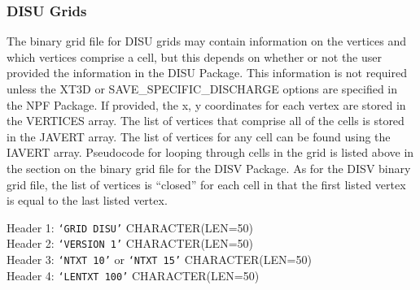 \newpage
\subsubsection{DISU Grids}

The binary grid file for DISU grids may contain information on the vertices and which vertices comprise a cell, but this depends on whether or not the user provided the information in the DISU Package.  This information is not required unless the XT3D or SAVE\_SPECIFIC\_DISCHARGE options are specified in the NPF Package.  If provided, the x, y coordinates for each vertex are stored in the VERTICES array.  The list of vertices that comprise all of the cells is stored in the JAVERT array.  The list of vertices for any cell can be found using the IAVERT array.  Pseudocode for looping through cells in the grid is listed above in the section on the binary grid file for the DISV Package.  As for the DISV binary grid file, the list of vertices is ``closed'' for each cell in that the first listed vertex is equal to the last listed vertex.

\vspace{5mm}
\noindent Header 1: \texttt{`GRID DISU'}  {\color{red} \footnotesize{CHARACTER(LEN=50)}} \\
\noindent Header 2: \texttt{`VERSION 1'}  {\color{red} \footnotesize{CHARACTER(LEN=50)}} \\
\noindent Header 3: \texttt{`NTXT 10'} or \texttt{`NTXT 15'} {\color{red} \footnotesize{CHARACTER(LEN=50)}}\\
\noindent Header 4: \texttt{`LENTXT 100'} {\color{red} \footnotesize{CHARACTER(LEN=50)}}\\

